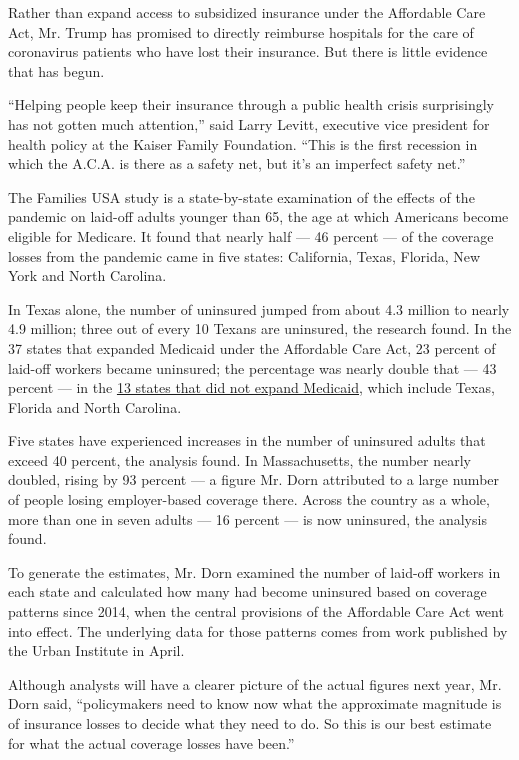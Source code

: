 Rather than expand access to subsidized insurance under the Affordable
Care Act, Mr. Trump has promised to directly reimburse hospitals for the
care of coronavirus patients who have lost their insurance. But there is
little evidence that has begun.

``Helping people keep their insurance through a public health crisis
surprisingly has not gotten much attention,'' said Larry Levitt,
executive vice president for health policy at the Kaiser Family
Foundation. ``This is the first recession in which the A.C.A. is there
as a safety net, but it's an imperfect safety net.''

The Families USA study is a state-by-state examination of the effects of
the pandemic on laid-off adults younger than 65, the age at which
Americans become eligible for Medicare. It found that nearly half --- 46
percent --- of the coverage losses from the pandemic came in five
states: California, Texas, Florida, New York and North Carolina.

In Texas alone, the number of uninsured jumped from about 4.3 million to
nearly 4.9 million; three out of every 10 Texans are uninsured, the
research found. In the 37 states that expanded Medicaid under the
Affordable Care Act, 23 percent of laid-off workers became uninsured;
the percentage was nearly double that --- 43 percent --- in the
\href{https://www.kff.org/medicaid/issue-brief/status-of-state-medicaid-expansion-decisions-interactive-map/}{13
states that did not expand Medicaid}, which include Texas, Florida and
North Carolina.

Five states have experienced increases in the number of uninsured adults
that exceed 40 percent, the analysis found. In Massachusetts, the number
nearly doubled, rising by 93 percent --- a figure Mr. Dorn attributed to
a large number of people losing employer-based coverage there. Across
the country as a whole, more than one in seven adults --- 16 percent ---
is now uninsured, the analysis found.

To generate the estimates, Mr. Dorn examined the number of laid-off
workers in each state and calculated how many had become uninsured based
on coverage patterns since 2014, when the central provisions of the
Affordable Care Act went into effect. The underlying data for those
patterns comes from work published by the Urban Institute in April.

Although analysts will have a clearer picture of the actual figures next
year, Mr. Dorn said, ``policymakers need to know now what the
approximate magnitude is of insurance losses to decide what they need to
do. So this is our best estimate for what the actual coverage losses
have been.''

